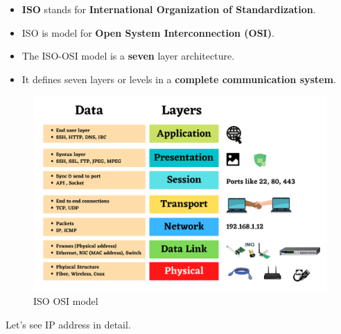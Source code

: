 \setlength{\columnsep}{3pt}
\begin{flushleft}

\begin{itemize}
	\item \textbf{ISO} stands for \textbf{International Organization of Standardization}.
	\item ISO is model for \textbf{Open System Interconnection (OSI)}.
	\item The ISO-OSI model is a \textbf{seven} layer architecture.
	\item It defines seven layers or levels in a \textbf{complete communication system}.
\end{itemize}

\begin{figure}[h!]
	\centering
	\includegraphics[scale=0.3]{content/chapter14/images/iso-osi.png}
	\caption{ISO OSI model}
	\label{fig:iso_osi}
\end{figure}

Let's see IP address in detail.

	
	
\end{flushleft}
\newpage


